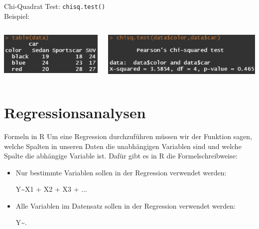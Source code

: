 \documentclass[xcolor=dvipsnames, aspectratio = 169]{beamer}
\begin{document}
\begin{frame}[fragile]{Chi-Quadrat Test:}	
	\verb+chisq.test()+ \\

	Beispiel: \\
	\begin{columns}[T]
		\begin{column}{0.4\textwidth}
			\includegraphics{tabledata}
		\end{column}
		\begin{column}{0.6\textwidth}
			\includegraphics{chisq}
		\end{column}
	\end{columns}
\end{frame}


\section{Regressionsanalysen}

\begin{frame}[fragile]{Formeln in R}
	Um eine Regression durchzuführen müssen wir der Funktion sagen, welche Spalten in unseren Daten die unabhängigen Variablen sind und welche Spalte die abhängige Variable ist. Dafür gibt	es in R die Formelschreibweise:
	\begin{itemize}
		\item Nur bestimmte Variablen sollen in der Regression verwendet werden:
			\begin{center}
				Y\textasciitilde X1 + X2 + X3 + ... 
			\end{center}
		\item Alle Variablen im Datensatz sollen in der Regression verwendet werden:
			\begin{center}
				Y\textasciitilde.
			\end{center}
	\end{itemize}
\end{frame}
\end{document}

